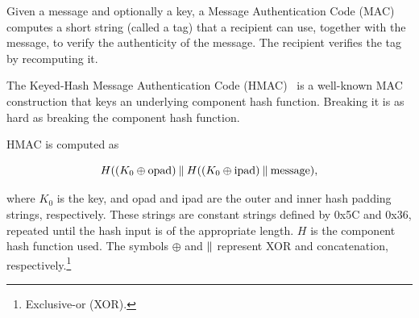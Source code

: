 Given a message and optionally a key, a Message Authentication Code (MAC) computes a short string (called a tag) 
that a recipient can use, together with the message, to verify the authenticity of the message.  The recipient 
verifies the tag by recomputing it.

The Keyed-Hash Message Authentication Code (HMAC)~\cite{HMAC,FIPS-198-1} 
is a well-known MAC construction that keys an underlying component hash function.  
Breaking it is as hard as breaking the component hash function.

HMAC is computed as

\begin{equation}
H((K_0\oplus \text{opad})\mathbin{\|} H((K_0\oplus \text{ipad})\mathbin{\|} \text{message}) ,
\end{equation}

\noindent
where $K_0$ is the key, and opad and ipad are the outer and inner hash padding strings, respectively. 
These strings are constant strings defined by 0x5C and 0x36, repeated until the hash input is of the appropriate length. 
$H$ is the component hash function used. 
The symbols $\oplus$ and $\mathbin{\|}$ represent XOR and concatenation, respectively.\footnote{Exclusive-or (XOR).}




